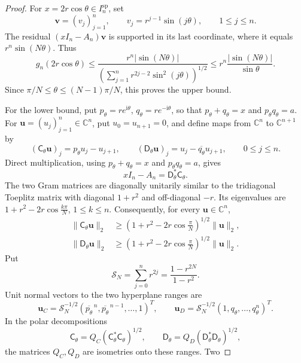 \documentclass[a4paper,preprint,12pt,nopreprintline,sort&compress]{elsarticle}
\numberwithin{equation}{section}
\theoremstyle{remark}
\newcommand{\C}{\mathbb C}
\newcommand{\ii}{\mathrm i}
\begin{document}
\begin{proof}
For \(x=2r\cos\theta\in I_n^{\mathrm{sp}}\), set
\[
 \boldsymbol v=(v_j)_{j=1}^n,\qquad
 v_j=r^{j-1}\sin(j\theta),\qquad1\leq j\leq n.
\]
The residual \((xI_n-A_n)\boldsymbol v\) is supported in its last
coordinate, where it equals \(r^n\sin(N\theta)\).  Thus
\[
 g_n(2r\cos\theta)
 \leq\frac{r^n|\sin(N\theta)|}
 {\left(\sum_{j=1}^nr^{2j-2}\sin^2(j\theta)\right)^{1/2}}
 \leq r^n\frac{|\sin(N\theta)|}{\sin\theta}.
\]
Since \(\pi/N\leq\theta\leq(N-1)\pi/N\), this proves the upper bound.

For the lower bound, put
\(p_\theta=re^{\ii\theta}\), \(q_\theta=re^{-\ii\theta}\), so that
\(p_\theta+q_\theta=x\) and \(p_\theta q_\theta=a\).  For
\(\boldsymbol u=(u_j)_{j=1}^n\in\C^n\), put \(u_0=u_{n+1}=0\), and
define maps from \(\C^n\) to \(\C^{n+1}\) by
\[
 (\mathsf{C}_\theta\boldsymbol u)_j=p_\theta u_j-u_{j+1},\qquad
 (\mathsf{D}_\theta\boldsymbol u)_j=u_j-\overline{q_\theta}u_{j+1},
 \qquad0\leq j\leq n.
\]
Direct multiplication, using \(p_\theta+q_\theta=x\) and
\(p_\theta q_\theta=a\), gives
\begin{equation}\label{eq:rectangular-factorization}
 xI_n-A_n=\mathsf{D}_\theta^*\mathsf{C}_\theta.
\end{equation}
The two Gram matrices are
diagonally unitarily similar to the tridiagonal Toeplitz matrix with
diagonal \(1+r^2\) and off-diagonal \(-r\).  Its eigenvalues are
\(1+r^2-2r\cos\frac{k\pi}{N}\), \(1\leq k\leq n\).  Consequently, for
every \(\boldsymbol u\in\C^n\),
\begin{equation}\label{eq:rectangular-min}
 \begin{aligned}
  \lVert\mathsf C_\theta\boldsymbol u\rVert_2
  &\geq \left(1+r^2-2r\cos\frac{\pi}{N}\right)^{1/2}
    \lVert\boldsymbol u\rVert_2,\\
  \lVert\mathsf D_\theta\boldsymbol u\rVert_2
  &\geq \left(1+r^2-2r\cos\frac{\pi}{N}\right)^{1/2}
    \lVert\boldsymbol u\rVert_2.
 \end{aligned}
\end{equation}
Put
\[
 \mathcal S_N=\sum_{j=0}^nr^{2j}=\frac{1-r^{2N}}{1-r^2}.
\]
Unit normal vectors to the two hyperplane ranges are
\[
 \boldsymbol u_C=\mathcal S_N^{-1/2}
 (\overline{p_\theta}^{\,n},\overline{p_\theta}^{\,n-1},\ldots,1)^T,
 \qquad
 \boldsymbol u_D=\mathcal S_N^{-1/2}(1,q_\theta,\ldots,q_\theta^n)^T.
\]
In the polar decompositions
\[
 \mathsf{C}_\theta=Q_C(\mathsf{C}_\theta^*\mathsf{C}_\theta)^{1/2},
 \qquad
 \mathsf{D}_\theta=Q_D(\mathsf{D}_\theta^*\mathsf{D}_\theta)^{1/2},
\]
the matrices \(Q_C,Q_D\) are isometries onto these ranges.  Two

\end{proof}
\end{document}

